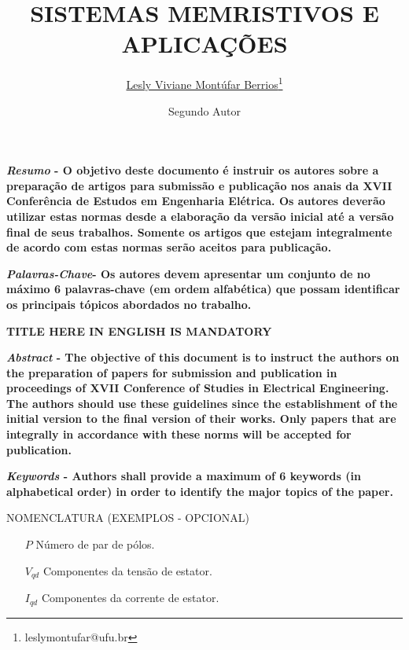 \documentclass{ceel}
\title{SISTEMAS MEMRISTIVOS E APLICAÇÕES}
\author[1]{\underline{Lesly Viviane Montúfar Berrios}\thanks{leslymontufar@ufu.br}}
\author[1]{Segundo Autor}
\affil[1]{FEELT - Universidade Federal de Uberlândia}
\begin{document}
\inserirtitulo

\begin{multicols}{2}

\textbf{\emph{Resumo} - O objetivo deste documento é instruir os autores sobre a preparação de artigos para submissão e publicação nos anais da XVII Conferência de Estudos em Engenharia Elétrica. Os autores deverão utilizar estas normas desde a elaboração da versão inicial até a versão final de seus trabalhos. Somente os artigos que estejam integralmente de acordo com estas normas serão aceitos para publicação.}
\vspace*{10pt}

\textbf{\emph{Palavras-Chave}- Os autores devem apresentar um conjunto de no máximo 6 palavras-chave (em ordem alfabética) que possam identificar os principais tópicos abordados no trabalho.}


\begin{center}
\noindent\textbf{\large \uppercase{TITLE HERE IN ENGLISH IS MANDATORY}}
\end{center}

\textbf{\emph{Abstract} - The objective of this document is to instruct the authors on the preparation of papers for submission and publication in proceedings of XVII Conference of Studies in Electrical Engineering. The authors should use these guidelines since the establishment of the initial version to the final version of their works. Only papers that are integrally in accordance with these norms will be accepted for publication. }
\vspace*{10pt}

\textbf{\emph{Keywords} - Authors shall provide a maximum of 6 keywords (in alphabetical order) in order to identify the major topics of the paper.}


\begin{center}
\uppercase{NOMENCLATURA (EXEMPLOS - OPCIONAL)}
\end{center}
\begin{itemize}
\setlength\itemsep{1mm}
\item [$P$] Número de par de pólos.
\item [$V_{qd}$] Componentes da tensão de estator.
\item [$I_{qd}$] Componentes da corrente de estator.
\end{itemize}


\end{multicols}
\end{document}
